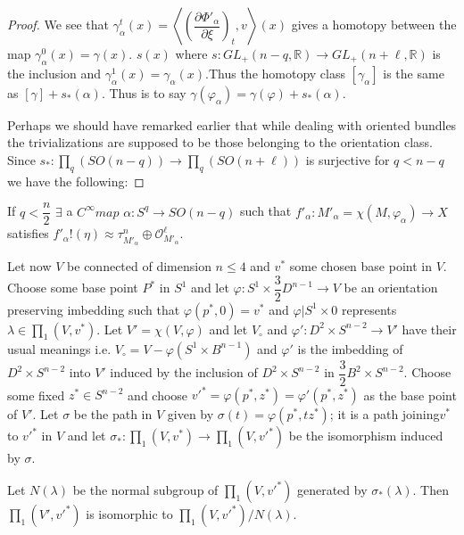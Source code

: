 \begin{proof}
We see that $\gamma^t_\alpha (x) = \left\langle
\left(\dfrac{\partial\Phi'_\alpha}{\partial \xi } \right)_t, v
\right\rangle (x)$ gives a homotopy 
between the map $\gamma^0 _\alpha (x) = \gamma (x) $. $s(x) $ where
$s: GL_+ (n-q, \mathbb{R}) \rightarrow GL_+ (n+\ell, \mathbb{R}) $ is
the inclusion and $\gamma^1_\alpha (x) =
\gamma_\alpha(x)$.\pageoriginale Thus the homotopy class
$[\gamma_\alpha]$ is the same as $[\gamma]+s_*(\alpha)$. Thus is to
say $\gamma (\varphi_\alpha) = \gamma (\varphi) + s_* (\alpha)$.   

Perhaps we should have remarked earlier that while dealing with
oriented bundles the trivializations are supposed to be those
belonging to the orientation class. Since $s_*: \prod_q (SO (n-q))
\rightarrow \prod_q (SO (n+\ell)) $ is surjective for $q < n-q$ we
have the following:  
\end{proof}

\setcounter{prop}{6}
\begin{prop}\label{chap1:prop3.7}%
If $q< \dfrac{n}{2}$ $\exists$ a $C^\infty map $ $\alpha: S^q \rightarrow SO
(n-q)$ such that $f'_\alpha : M'_\alpha = \chi (M, \varphi_\alpha )
\rightarrow X $ satisfies $ f'_\alpha ! (\eta) \approx
\tau^n_{M'_\alpha }\oplus \mathscr{O}^\ell_{M'_\alpha}$.  

Let now $V$ be connected of dimension $n\leq 4$ and $v^*$ some chosen
base point in $V$. Choose some base point $P^*$ in $S^1$ and let
$\varphi: S^1 \times \dfrac{3}{2}D^{n-1}\rightarrow V$ be an
orientation preserving imbedding such that $\varphi(p^*,0) = v^* $ and
$\varphi \big| S^1 \times 0 $ represents $\lambda \in \prod_1
(V,v^*)$. Let $V' = \chi (V, \varphi)$ and let $V_\circ$ and $\varphi': D^2
\times S^{n-2}\rightarrow V'$ have their usual meanings i.e. $V_\circ = V
- \varphi (S^1 \times B^{n-1})$ and $\varphi'$ is the imbedding of
$D^2 \times S^{n-2}$ into $V'$ induced by the inclusion of $D^2 \times
S^{n-2}$ in $\dfrac{3}{2}B^2 \times S^{n-2}$. Choose some fixed
$z^*\in S^{n-2}$ and choose $v'^* = \varphi (p^*,z^*) =
\varphi' (p^* , z^*) $ as the base point of $V'$. Let $\sigma$ be the
path in $V$ given by $\sigma (t) = \varphi (p^*, tz^*)$; it is a path
joining\pageoriginale $v^*$ to $v'^*$ in $V$ and let $\sigma_*:
\prod_1 (V, v^*) \rightarrow \prod_1 (V, v'^*)$ be the isomorphism
induced by $\sigma$.   
\end{prop}

\setcounter{lemma}{7}
\begin{lemma}\label{chap1:lem3.8}%
Let $N(\lambda)$ be the normal subgroup of $\prod_1 (V, {v'}^*)$
generated by $\sigma_* (\lambda)$. Then $\prod_1 (V', {v'}^*)$ is
isomorphic to $\prod_1 (V, v'^\ast)/ N(\lambda)$. 
\end{lemma}


